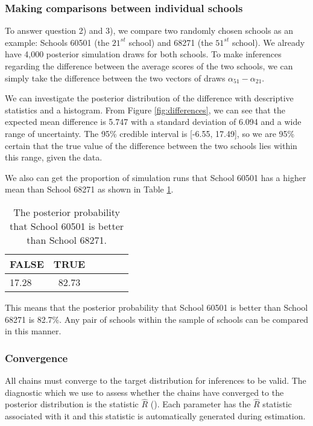 \subsubsection{Making comparisons between individual schools}

To answer question 2) and 3), we compare two randomly chosen schools as an example: Schools 60501 (the $21^{st}$ school) and 68271 (the $51^{st}$ school). We already have 4,000 posterior simulation draws for both schools. To make inferences regarding the difference between the average scores of the two schools, we can simply take the difference between the two vectors of draws $\alpha_{51} - \alpha_{21}$.

We can investigate the posterior distribution of the difference with descriptive statistics and a histogram. From Figure \ref{fig:differences}, we can see that the expected mean difference is 5.747 with a standard deviation of 6.094 and a wide range of uncertainty. The 95\% credible interval is [-6.55, 17.49], so we are 95\% certain that the true value of the difference between the two schools lies within this range, given the data.

We also can get the proportion of simulation runs that School 60501 has a higher mean than School 68271 as shown in Table \ref{tab:comparison}.

\begin{table}[ht]
	\centering
	\def\arraystretch{1.3}
	{\small
		\begin{tabular}{l | c c c c c}
			FALSE & TRUE \\
			\hline
			17.28 & 82.73
		\end{tabular}
	}
	\caption{{\small The  posterior probability that School 60501 is better than School 68271.}}
	\label{tab:comparison}
\end{table}

This means that the posterior probability that School 60501 is better than School 68271 is 82.7\%. Any pair of schools within the sample of schools can be compared in this manner.

\subsubsection{Convergence}
All chains must converge to the target distribution for inferences to be valid. The diagnostic which we use to assess whether the chains have converged to the posterior distribution is the statistic $\hat{R}$ (\cite{gelman1992inference}). Each parameter has the $\hat{R}$ statistic associated with it and this statistic is automatically generated during estimation.


